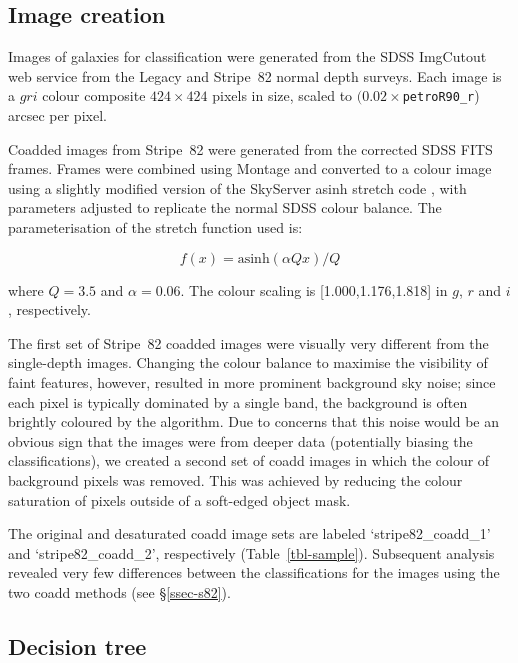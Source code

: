 \documentclass[useAMS,usenatbib]{mn2e}
\begin{document}
\subsection{Image creation}\label{ssec-imagecreation}

Images of galaxies for classification were generated from the SDSS ImgCutout web service \citep{nie04} from the Legacy and Stripe~82 normal depth surveys. Each image is a $gri$ colour composite $424\times424$ pixels in size, scaled to $(0.02\times${\tt petroR90\_r}) arcsec per pixel.

Coadded images from Stripe~82 were generated from the corrected SDSS FITS frames. Frames were combined using Montage \citep{jac10} and converted to a colour image using a slightly modified version of the SkyServer asinh stretch code \citep{lup04}, with parameters adjusted to replicate the normal SDSS colour balance. The parameterisation of the stretch function used is:

\begin{equation}
f(x)=\text{asinh}(\alpha Q x)/Q         %
\label{eqn-imagegen}
\end{equation}

\noindent where $Q=3.5$ and $\alpha=0.06$. The colour scaling is [1.000,1.176,1.818] in $g$, $r$ and $i$, respectively. 

The first set of Stripe~82 coadded images were visually very different from the single-depth images. Changing the colour balance to maximise the visibility of faint features, however, resulted in more prominent background sky noise; since each pixel is typically dominated by a single band, the background is often brightly coloured by the \citet{lup04} algorithm. Due to concerns that this noise would be an obvious sign that the images were from deeper data (potentially biasing the classifications), we created a second set of coadd images in which the colour of background pixels was removed. This was achieved by reducing the colour saturation of pixels outside of a soft-edged object mask. 

The original and desaturated coadd image sets are labeled `stripe82\_coadd\_1' and `stripe82\_coadd\_2', respectively (Table~\ref{tbl-sample}). Subsequent analysis revealed very few differences between the classifications for the images using the two coadd methods (see \S\ref{ssec-s82}). 

\subsection{Decision tree}\label{ssec-decision_tree}
\end{document}
